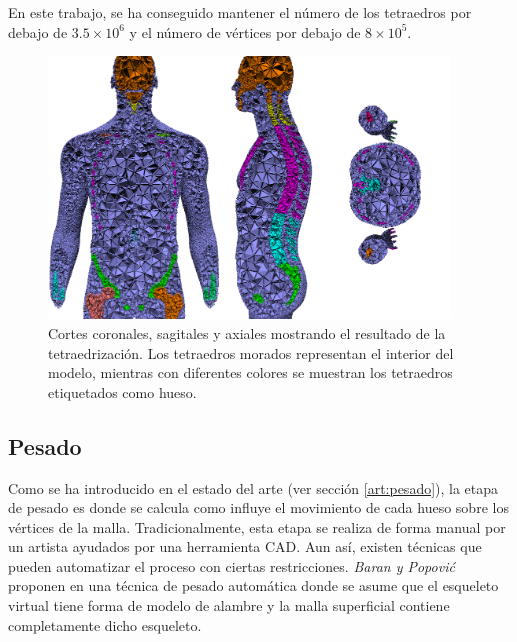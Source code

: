 En este trabajo, se ha conseguido mantener el número de los tetraedros por debajo de $3.5\times 10^6$ y el número de vértices por debajo de $8 \times 10^5$. 
%
\begin{figure}[th]
   \centering
    \includegraphics[width=0.95\textwidth]{IMG/boneid.png}
     \caption{Cortes coronales, sagitales y axiales mostrando el resultado de la tetraedrización. Los tetraedros morados representan el interior del modelo, mientras con diferentes colores se muestran los tetraedros etiquetados como hueso.}
\label{fig:tetra}
\end{figure} 

\subsection{Pesado}
\label{posing:Pesado}
%
Como se ha introducido en el estado del arte (ver sección \ref{art:pesado}), la etapa de pesado es donde se calcula como influye el movimiento de cada hueso sobre los vértices de la malla.
Tradicionalmente, esta etapa se realiza de forma manual por un artista ayudados por una herramienta  \ac{CAD}. Aun así, existen técnicas que pueden automatizar el proceso con ciertas restricciones. \emph{Baran y Popovi\'{c}} proponen en \cite{Baran:2007} una técnica de pesado automática donde se asume que el esqueleto virtual tiene forma de modelo de alambre y la malla superficial contiene completamente dicho esqueleto.

